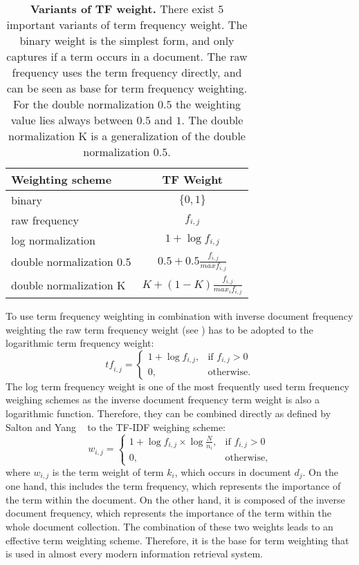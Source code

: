 \begin{table}[b!]
    \centering
    \begin{tabular}{ l c }
      \toprule
      \textbf{Weighting scheme} & \textbf{TF Weight} \\ \midrule
      binary  & $\{0, 1\}$  \\
      raw frequency & $f_{i, j}$  \\
      log normalization & $1 + \log f_{i, j}$  \\
      double normalization $0.5$ & $0.5 + 0.5 \frac{f_{i, j}}{max f_{i, j}}$  \\
      double normalization K & $K + (1 - K)\frac{f_{i, j}}{max_i f_{i, j}}$  \\
      \bottomrule
    \end{tabular}
  \caption[Variants of TF weight]{\textbf{Variants of TF weight.} There exist $5$ important variants of term frequency weight. The binary weight is the simplest form, and only captures if a term occurs in a document. The raw frequency uses the term frequency directly, and can be seen as base for term frequency weighting. For the double normalization $0.5$ the weighting value lies always between $0.5$ and $1$. The double normalization K is a generalization of the double normalization $0.5$.}
  \label{tbl:tf_variants}
\end{table}

To use term frequency weighting in combination with inverse document frequency weighting the raw term frequency weight (see ) has to be adopted to the logarithmic term frequency weight:
\begin{equation}
  \mathit{tf}_{i, j} =
  \begin{cases}
    1 + \log f_{i, j}, & \text{if $f_{i,j} > 0$} \\
    0, & \text{otherwise}.
  \end{cases}
\end{equation}
The log term frequency weight is one of the most frequently used term frequency weighing schemes as the inverse document frequency term weight is also a logarithmic function. Therefore, they can be combined directly as defined by Salton and Yang ~\cite{FT023} to the TF-IDF weighing scheme:
\begin{equation}
  w_{i, j} =
  \begin{cases}
    1 + \log f_{i, j} \times \log \frac{N}{n_i}, & \text{if $f_{i,j} > 0$} \\
    0, & \text{otherwise},
  \end{cases}
\end{equation}
where $w_{i, j}$ is the term weight of term $k_i$, which occurs in document $d_j$. On the one hand, this includes the term frequency, which represents the importance of the term within the document. On the other hand, it is composed of the inverse document frequency, which represents the importance of the term within the whole document collection. The combination of these two weights leads to an effective term weighting scheme. Therefore, it is the base for term weighting that is used in almost every modern information retrieval system.


